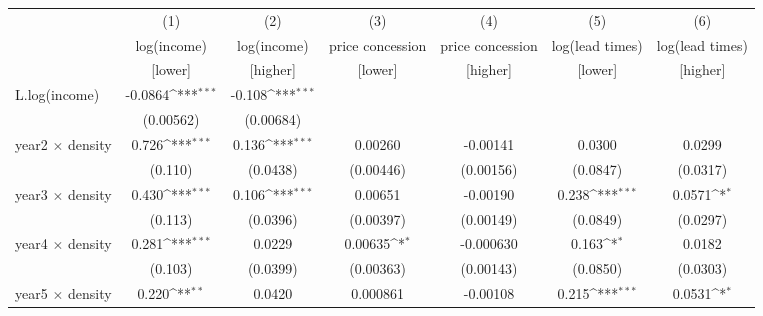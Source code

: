 {
\def\sym#1{\ifmmode^{#1}\else\(^{#1}\)\fi}
\begin{tabular}{l*{6}{c}}
\toprule
            &\multicolumn{1}{c}{(1)}&\multicolumn{1}{c}{(2)}&\multicolumn{1}{c}{(3)}&\multicolumn{1}{c}{(4)}&\multicolumn{1}{c}{(5)}&\multicolumn{1}{c}{(6)}\\
            &\multicolumn{1}{c}{log(income)}&\multicolumn{1}{c}{log(income)}&\multicolumn{1}{c}{price concession}&\multicolumn{1}{c}{price concession}&\multicolumn{1}{c}{log(lead times)}&\multicolumn{1}{c}{log(lead times)}\\
            &\multicolumn{1}{c}{[lower]}&\multicolumn{1}{c}{[higher]}&\multicolumn{1}{c}{[lower]}&\multicolumn{1}{c}{[higher]}&\multicolumn{1}{c}{[lower]}&\multicolumn{1}{c}{[higher]}\\
\midrule
L.log(income) &     -0.0864\sym{***}&      -0.108\sym{***}&                     &                     &                     &                     \\
            &   (0.00562)         &   (0.00684)         &                     &                     &                     &                     \\
\addlinespace
year2 $\times$ density&       0.726\sym{***}&       0.136\sym{***}&     0.00260         &    -0.00141         &      0.0300         &      0.0299         \\
            &     (0.110)         &    (0.0438)         &   (0.00446)         &   (0.00156)         &    (0.0847)         &    (0.0317)         \\
\addlinespace
year3 $\times$ density&       0.430\sym{***}&       0.106\sym{***}&     0.00651         &    -0.00190         &       0.238\sym{***}&      0.0571\sym{*}  \\
            &     (0.113)         &    (0.0396)         &   (0.00397)         &   (0.00149)         &    (0.0849)         &    (0.0297)         \\
\addlinespace
year4 $\times$ density&       0.281\sym{***}&      0.0229         &     0.00635\sym{*}  &   -0.000630         &       0.163\sym{*}  &      0.0182         \\
            &     (0.103)         &    (0.0399)         &   (0.00363)         &   (0.00143)         &    (0.0850)         &    (0.0303)         \\
\addlinespace
year5 $\times$ density&       0.220\sym{**} &      0.0420         &    0.000861         &    -0.00108         &       0.215\sym{***}&      0.0531\sym{*}  \\

\end{tabular}}
